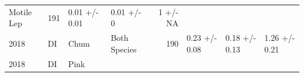 \documentclass[fleqn,10pt]{wlpeerj} %
\begin{document}
\begin{longtable}[]{@{}llllrlll@{}}
\begin{minipage}[t]{0.11\columnwidth}
Motile Lep\strut
\end{minipage} & \begin{minipage}[t]{0.04\columnwidth}\raggedleft\strut
191\strut
\end{minipage} & \begin{minipage}[t]{0.14\columnwidth}\raggedright\strut
0.01 +/- 0.01\strut
\end{minipage} & \begin{minipage}[t]{0.14\columnwidth}\raggedright\strut
0.01 +/- 0\strut
\end{minipage} & \begin{minipage}[t]{0.14\columnwidth}\raggedright\strut
1 +/- NA\strut
\end{minipage}\tabularnewline
\begin{minipage}[t]{0.09\columnwidth}\raggedright\strut
2018\strut
\end{minipage} & \begin{minipage}[t]{0.06\columnwidth}\raggedright\strut
DI\strut
\end{minipage} & \begin{minipage}[t]{0.06\columnwidth}\raggedright\strut
Chum\strut
\end{minipage} & \begin{minipage}[t]{0.11\columnwidth}\raggedright\strut
Both Species\strut
\end{minipage} & \begin{minipage}[t]{0.04\columnwidth}\raggedleft\strut
190\strut
\end{minipage} & \begin{minipage}[t]{0.14\columnwidth}\raggedright\strut
0.23 +/- 0.08\strut
\end{minipage} & \begin{minipage}[t]{0.14\columnwidth}\raggedright\strut
0.18 +/- 0.13\strut
\end{minipage} & \begin{minipage}[t]{0.14\columnwidth}\raggedright\strut
1.26 +/- 0.21\strut
\end{minipage}\tabularnewline
\begin{minipage}[t]{0.09\columnwidth}\raggedright\strut
2018\strut
\end{minipage} & \begin{minipage}[t]{0.06\columnwidth}\raggedright\strut
DI\strut
\end{minipage} & \begin{minipage}[t]{0.06\columnwidth}\raggedright\strut
Pink\strut
\end{minipage} & \begin{minipage}[t]{0.11\columnwidth}\raggedright\strut

\end{minipage}
\end{longtable}
\end{document}
